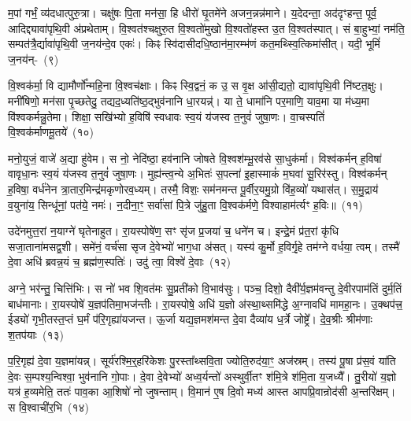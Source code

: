 म॒पां गर्भं॒ व्य॑दधात्पुरु॒त्रा। चक्षु॑षः पि॒ता मन॑सा॒ हि धीरो॑ घृ॒तमे॑ने अजन॒न्नन्न॑माने। य॒देदन्ता॒ अद॑दृꣳहन्त॒ पूर्व॒ आदिद्द्यावा॑\-पृथि॒वी अ॑प्रथेताम्। वि॒श्वत॑श्चक्षुरु॒त वि॒श्वतो॑मुखो वि॒श्वतो॑हस्त उ॒त वि॒श्वत॑स्पात्। सं बा॒हुभ्यां॒ नम॑ति॒ सम्पत॑त्रै॒र्द्यावा॑\-पृथि॒वी ज॒नय॑न्दे॒व एकः॑। किꣴ स्वि॑दासीदधि॒ष्ठान॑मा॒रम्भ॑णं कत॒मथ्स्वि॒त्किमा॑सीत्। यदी॒ भूमिं॑ ज॒नय॑न्-~(९)

वि॒श्वक॑र्मा॒ वि द्यामौर्णो᳚न्महि॒ना वि॒श्वच॑क्षाः। किꣴ स्वि॒द्वनं॒ क उ॒ स वृ॒क्ष आ॑सी॒द्यतो॒ द्यावा॑\-पृथि॒वी नि॑ष्टत॒क्षुः। मनी॑षिणो॒ मन॑सा पृ॒च्छतेदु॒ तद्यद॒ध्यति॑ष्ठ॒द्भुव॑नानि धा॒रयन्न्॑। या ते॒ धामा॑नि पर॒माणि॒ याव॒मा या म॑ध्य॒मा वि॑श्वकर्मन्नु॒तेमा। शिक्षा॒ सखि॑भ्यो ह॒विषि॑ स्वधावः स्व॒यं य॑जस्व त॒नुवं॑ जुषा॒णः। वा॒चस्पतिं॑ वि॒श्वक॑र्माणमू॒तये॑~(१०)

मनो॒युजं॒ वाजे॑ अ॒द्या हु॑वेम। स नो॒ नेदि॑ष्ठा॒ हव॑नानि जोषते वि॒श्वश॑म्भू॒रव॑से सा॒धुक॑र्मा। विश्व॑कर्मन् ह॒विषा॑ वावृधा॒नः स्व॒यं य॑जस्व त॒नुवं॑ जुषा॒णः। मुह्य॑न्त्व॒न्ये अ॒भितः॑ स॒पत्ना॑ इ॒हास्माकं॑ म॒घवा॑ सू॒रिर॑स्तु। विश्व॑कर्मन् ह॒विषा॒ वर्ध॑नेन त्रा॒तार॒मिन्द्र॑मकृणोरव॒ध्यम्। तस्मै॒ विशः॒ सम॑नमन्त पू॒र्वीर॒यमु॒ग्रो वि॑ह॒व्यो॑ यथास॑त्। स॒मु॒द्राय॑ व॒युना॑य॒ सिन्धू॑नां॒ पत॑ये॒ नमः॑। न॒दीना॒ꣳ॒ सर्वा॑सां पि॒त्रे जु॑हु॒ता वि॒श्वक॑र्मणे॒ विश्वाहाम॑र्त्यꣳ ह॒विः॥~(११)

{\anuvakamend[{ज॒जानै॒नौष॑धीनां॒ भूमिं॑ ज॒नय॑न्नू॒तये॒ नमो॒ नव॑ च}]}%

उदे॑नमुत्त॒रां न॒याग्ने॑ घृतेनाहुत। रा॒यस्पोषे॑ण॒ सꣳ सृ॑ज प्र॒जया॑ च॒ धने॑न च। इन्द्रे॒मं प्र॑त॒रां कृ॑धि सजा॒ताना॑मसद्व॒शी। समे॑नं॒ वर्च॑सा सृज दे॒वेभ्यो॑ भाग॒धा अ॑सत्। यस्य॑ कु॒र्मो ह॒विर्गृ॒हे तम॑ग्ने वर्धया॒ त्वम्। तस्मै॑ दे॒वा अधि॑ ब्रवन्न॒यं च॒ ब्रह्म॑ण॒स्पतिः॑। उदु॑ त्वा॒ विश्वे॑ दे॒वाः~(१२)

अग्ने॒ भर॑न्तु॒ चित्ति॑भिः। स नो॑ भव शि॒वत॑मः सु॒प्रती॑को वि॒भाव॑सुः। पञ्च॒ दिशो॒ दैवी᳚र्य॒ज्ञम॑वन्तु दे॒वीरपाम॑तिं दुर्म॒तिं बाध॑मानाः। रा॒यस्पोषे॑ य॒ज्ञप॑तिमा॒भज॑न्तीः। रा॒यस्पोषे॒ अधि॑ य॒ज्ञो अ॑स्था॒थ्समि॑द्धे अ॒ग्नावधि॑ मामहा॒नः। उ॒क्थप॑त्त्र॒ ईड्यो॑ गृभी॒तस्त॒प्तं घ॒र्मं प॑रि॒गृह्या॑यजन्त। ऊ॒र्जा यद्य॒ज्ञमश॑मन्त दे॒वा दैव्या॑य ध॒र्त्रे जोष्ट्रे᳚। दे॒व॒श्रीः श्रीम॑णाः श॒तप॑याः~(१३)

प॒रि॒गृह्य॑ दे॒वा य॒ज्ञमा॑यन्न्। सूर्य॑रश्मि॒र्॒\mbox{}हरि॑केशः पु॒रस्ता᳚थ्सवि॒ता ज्योति॒रुद॑या॒ꣳ॒ अज॑स्रम्। तस्य॑ पू॒षा प्र॑स॒वं या॑ति दे॒वः स॒म्पश्य॒न्विश्वा॒ भुव॑नानि गो॒पाः। दे॒वा दे॒वेभ्यो॑ अध्व॒र्यन्तो॑ अस्थुर्वी॒तꣳ श॑मि॒त्रे श॑मि॒ता य॒जध्यै᳚। तु॒रीयो॑ य॒ज्ञो यत्र॑ ह॒व्यमेति॒ ततः॑ पाव॒का आ॒शिषो॑ नो जुषन्ताम्। वि॒मान॑ ए॒ष दि॒वो मध्य॑ आस्त आपप्रि॒वान्रोद॑सी अ॒न्तरि॑क्षम्। स वि॒श्वाची॑र॒भि~(१४)

